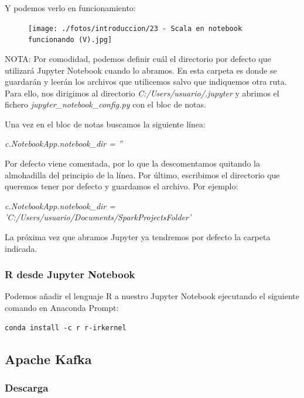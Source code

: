 \documentclass[a4paper,10pt]{article}
\begin{document}
Y podemos verlo en funcionamiento:

\begin{figure}[H]
\begin{center}
\texttt{[image: ./fotos/introduccion/23 - Scala en notebook funcionando (V).jpg]}
\end{center}
\end{figure}

NOTA: Por comodidad, podemos definir cuál el directorio por defecto que utilizará Jupyter Notebook cuando lo abramos. En esta carpeta es donde se guardarán y leerán los archivos que utilicemos salvo que indiquemos otra ruta. Para ello, nos dirigimos al directorio \textit{C:/Users/usuario/.jupyter} y abrimos el fichero 
\textit{jupyter\_notebook\_config.py} con el bloc de notas.

Una vez en el bloc de notas buscamos la siguiente línea:

\textit{c.NotebookApp.notebook\_dir = ''}

Por defecto viene comentada, por lo que la descomentamos quitando la almohadilla del principio de la línea. Por último, escribimos el directorio que queremos tener por defecto y guardamos el archivo. Por ejemplo:

\textit{c.NotebookApp.notebook\_dir = 'C:/Users/usuario/Documents/SparkProjectsFolder'}

La próxima vez que abramos Jupyter ya tendremos por defecto la carpeta indicada.

\subsubsection{R desde Jupyter Notebook}

Podemos añadir el lenguaje R a nuestro Jupyter Notebook ejecutando el siguiente comando en Anaconda Prompt:

\lstset{language=bash, breaklines=true, basicstyle=\ttfamily}
\begin{lstlisting}[frame=single]
conda install -c r r-irkernel
\end{lstlisting}

\clearpage

\subsection{Apache Kafka}

\subsubsection{Descarga}
\end{document}
